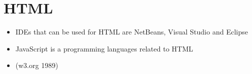 \documentclass{article}
\begin{document}
	\section{HTML}
	\begin{itemize}
		\item IDEs that can be used for HTML are NetBeans, Visual Studio and Eclipse
		\item JavaScript is a  programming languages related to HTML
		\item (w3.org 1989) 
	\end{itemize}
\end{document}
